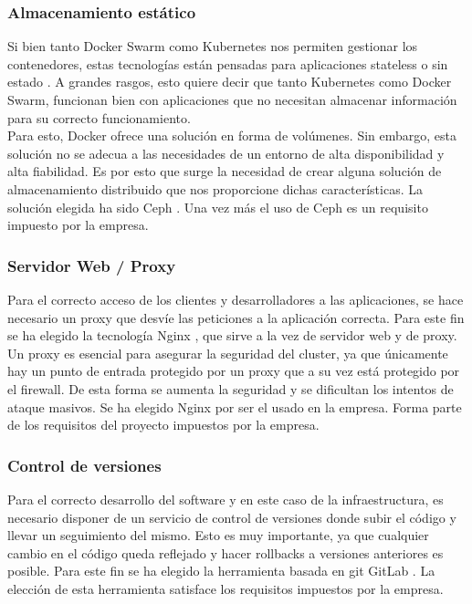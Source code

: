 \subsubsection{Almacenamiento estático}
\label{ceph}
\begin{text}
	Si bien tanto Docker Swarm como Kubernetes nos permiten gestionar los contenedores, estas tecnologías están pensadas para aplicaciones stateless o sin estado \cite{stateless:online}. A grandes rasgos, esto quiere decir que tanto Kubernetes como Docker Swarm, funcionan bien con aplicaciones que no necesitan almacenar información para su correcto funcionamiento. \\
	Para esto, Docker ofrece una solución en forma de volúmenes. Sin embargo, esta solución no se adecua a las necesidades de un entorno de alta disponibilidad  y alta fiabilidad. Es por esto que surge la necesidad de crear alguna solución de almacenamiento distribuido que nos proporcione dichas características. La solución elegida ha sido Ceph \cite{ceph:online}. Una vez más el uso de Ceph es un requisito impuesto por la empresa.
\end{text}
	
\subsubsection{Servidor Web / Proxy}
\begin{text}
	Para el correcto acceso de los clientes y desarrolladores a las aplicaciones, se hace necesario un proxy que desvíe las peticiones a la aplicación correcta. Para este fin se ha elegido la tecnología Nginx \cite{nginx:online}, que sirve a la vez de servidor web y de proxy. Un proxy es esencial para asegurar la seguridad del cluster, ya que únicamente hay un punto de entrada protegido por un proxy que a su vez está protegido por el firewall. De esta forma se aumenta la seguridad y se dificultan los intentos de ataque masivos. Se ha elegido Nginx por ser el usado en la empresa. Forma parte de los requisitos del proyecto impuestos por la empresa.
\end{text}

\subsubsection{Control de versiones}
\label{gitlab}
\begin{text}
	Para el correcto desarrollo del software y en este caso de la infraestructura, es necesario disponer de un servicio de control de versiones donde subir el código y llevar un seguimiento del mismo. Esto es muy importante, ya que cualquier cambio en el código queda reflejado y hacer rollbacks a versiones anteriores es posible. Para este fin se ha elegido la herramienta basada en git GitLab \cite{gitlab:online}. La elección de esta herramienta satisface los requisitos impuestos por la empresa.
\end{text}


